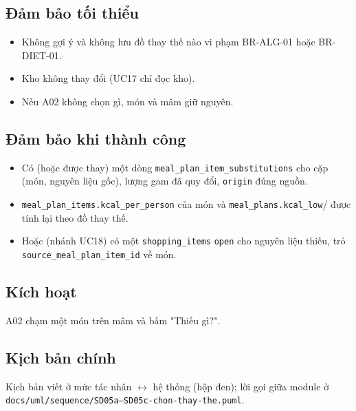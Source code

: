 \subsection{Đảm bảo tối thiểu}
\begin{itemize}
\item Không gợi ý và không lưu đồ thay thế nào vi phạm BR-\allowbreak{}ALG-\allowbreak{}01 hoặc BR-\allowbreak{}DIET-\allowbreak{}01.
\item Kho không thay đổi (UC17 chỉ đọc kho).
\item Nếu A02 không chọn gì, món và mâm giữ nguyên.
\end{itemize}
\subsection{Đảm bảo khi thành công}
\begin{itemize}
\item Có (hoặc được thay) một dòng {\small\texttt{meal\_\allowbreak{}\allowbreak{}plan\_\allowbreak{}\allowbreak{}item\_\allowbreak{}\allowbreak{}substitutions}} cho cặp (món, nguyên liệu gốc), lượng gam đã quy đổi, {\small\texttt{origin}} đúng nguồn.
\item {\small\texttt{meal\_\allowbreak{}\allowbreak{}plan\_\allowbreak{}\allowbreak{}items.\allowbreak{}kcal\_\allowbreak{}\allowbreak{}per\_\allowbreak{}\allowbreak{}person}} của món và {\small\texttt{meal\_\allowbreak{}\allowbreak{}plans.\allowbreak{}kcal\_\allowbreak{}\allowbreak{}low}}/ được tính lại theo đồ thay thế.
\item Hoặc (nhánh UC18) có một {\small\texttt{shopping\_\allowbreak{}\allowbreak{}items}} {\small\texttt{open}} cho nguyên liệu thiếu, trỏ {\small\texttt{source\_\allowbreak{}\allowbreak{}meal\_\allowbreak{}\allowbreak{}plan\_\allowbreak{}\allowbreak{}item\_\allowbreak{}\allowbreak{}id}} về món.
\end{itemize}
\subsection{Kích hoạt}
A02 chạm một món trên mâm và bấm "Thiếu gì?".

\subsection{Kịch bản chính}
Kịch bản viết ở mức tác nhân \ensuremath{\leftrightarrow} hệ thống (hộp đen); lời gọi giữa module ở {\small\texttt{docs/\allowbreak{}\allowbreak{}uml/\allowbreak{}\allowbreak{}sequence/\allowbreak{}\allowbreak{}SD05a–SD05c-\allowbreak{}chon-\allowbreak{}thay-\allowbreak{}the.\allowbreak{}puml}}.

